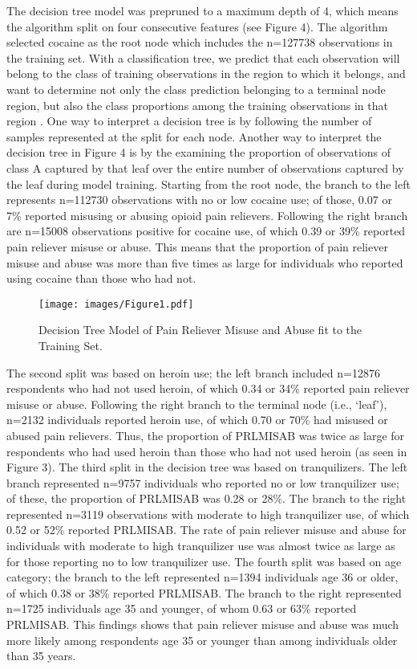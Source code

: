 \documentclass[sigconf]{acmart}
\begin{document}
The decision tree model was prepruned to a maximum depth of 4, which means 
the algorithm split on four consecutive features (see Figure 4). The  
algorithm selected cocaine as the root node which includes the n=127738 
observations in the training set. With a classification tree, we predict 
that each observation will belong to the class of training observations in 
the region to which it belongs, and want to determine not only the class
prediction belonging to a terminal node region, but also the class 
proportions among the training observations in that region \cite{james13}. 
One way to interpret a decision tree is by following the number of samples 
represented at the split for each node. Another way to interpret the decision 
tree in Figure 4 is by the examining the proportion of observations of 
class A captured by that leaf over the entire number of observations captured 
by the leaf during model training. Starting from the root node, the branch 
to the left represents n=112730 observations with no or low cocaine use; 
of those, 0.07 or 7\% reported misusing or abusing opioid pain relievers. 
Following the right branch are n=15008 observations positive for cocaine use, 
of which 0.39 or 39\% reported pain reliever misuse or abuse. This means that 
the proportion of pain reliever misuse and abuse was more than five times as 
large for individuals who reported using cocaine than those who had not. 

\begin{figure}[!ht]
  \centering\texttt{[image: images/Figure1.pdf]}
  \caption{Decision Tree Model of Pain Reliever Misuse and Abuse
  fit to the Training Set.}
  \label{f:Figure1}
\end{figure}

The second split was based on heroin use; the left branch included n=12876 
respondents who had not used heroin, of which 0.34 or 34\% reported pain
reliever misuse or abuse. Following the right branch to the terminal node 
(i.e., `leaf'), n=2132 individuals reported heroin use, of which 0.70 or 
70\% had misused or abused pain relievers. Thus, the proportion of PRLMISAB 
was twice as large for respondents who had used heroin than those who had 
not used heroin (as seen in Figure 3). The third split in the decision tree
was based on tranquilizers. The left branch represented n=9757 individuals 
who reported no or low tranquilizer use; of these, the proportion of 
PRLMISAB was 0.28 or 28\%. The branch to the right represented n=3119 
observations with moderate to high tranquilizer use, of which 0.52 or 52\% 
reported PRLMISAB. The rate of pain reliever misuse and abuse for individuals 
with moderate to high tranquilizer use was almost twice as large as for 
those reporting no to low tranquilizer use. The fourth split was based on age 
category; the branch to the left represented n=1394 individuals age 36 or older, 
of which 0.38 or 38\% reported PRLMISAB. The branch to the right represented 
n=1725 individuals age 35 and younger, of whom 0.63 or 63\% reported PRLMISAB. 
This findings shows that pain reliever misuse and abuse was much more likely
among respondents age 35 or younger than among individuals older than 35 years. 
\end{document}
